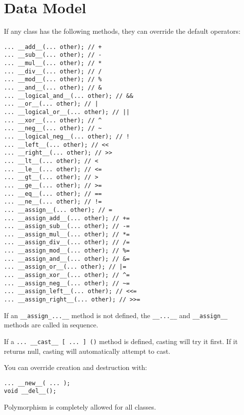 \documentclass[10pt,a4paper]{article}
\begin{document}
\section{Data Model}
\label{sec:dataModel}

If any class has the following methods, they can override the default operators:
\begin{verbatim}
... __add__(... other); // +
... __sub__(... other); // -
... __mul__(... other); // *
... __div__(... other); // /
... __mod__(... other); // %
... __and__(... other); // &
... __logical_and__(... other); // &&
... __or__(... other); // |
... __logical_or__(... other); // ||
... __xor__(... other); // ^
... __neg__(... other); // ~
... __logical_neg__(... other); // !
... __left__(... other); // <<
... __right__(... other); // >>
... __lt__(... other); // <
... __le__(... other); // <=
... __gt__(... other); // >
... __ge__(... other); // >=
... __eq__(... other); // ==
... __ne__(... other); // !=
... __assign__(... other); // =
... __assign_add__(... other); // +=
... __assign_sub__(... other); // -=
... __assign_mul__(... other); // *=
... __assign_div__(... other); // /=
... __assign_mod__(... other); // %=
... __assign_and__(... other); // &=
... __assign_or__(... other); // |=
... __assign_xor__(... other); // ^=
... __assign_neg__(... other); // ~=
... __assign_left__(... other); // <<=
... __assign_right__(... other); // >>=
\end{verbatim}

If an \verb|__assign_...__| method is not defined, the \verb|__...__| and \verb|__assign__| methods are called in sequence.

If a \verb|... __cast__ [ ... ] ()| method is defined, casting will try it first. If it returns null, casting will automatically attempt to cast.

You can override creation and destruction with:
\begin{verbatim}
... __new__( ... );
void __del__();
\end{verbatim}

Polymorphism is completely allowed for all classes.
\end{document}
